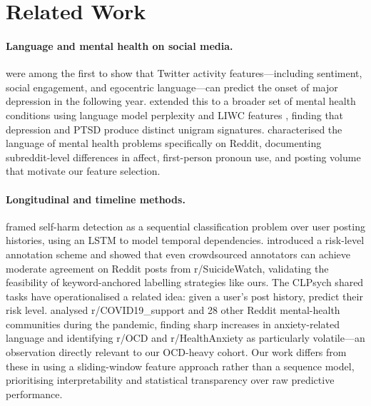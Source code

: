 \documentclass[11pt]{article}
\begin{document}
\section{Related Work}
\label{sec:related}

\paragraph{Language and mental health on social media.}
\citet{dechoudhury2013predicting} were among the first to show that
Twitter activity features---including sentiment, social engagement, and
egocentric language---can predict the onset of major depression in the
following year.
\citet{coppersmith2014quantifying} extended this to a broader set of
mental health conditions using language model perplexity and LIWC features
\citep{pennebaker2015development}, finding that depression and PTSD produce
distinct unigram signatures.
\citet{gkotsis2016language} characterised the language of mental health
problems specifically on Reddit, documenting subreddit-level differences
in affect, first-person pronoun use, and posting volume that motivate our
feature selection.

\paragraph{Longitudinal and timeline methods.}
\citet{yates2017depression} framed self-harm detection as a sequential
classification problem over user posting histories, using an LSTM to
model temporal dependencies.
\citet{shing2018expert} introduced a risk-level annotation scheme and
showed that even crowdsourced annotators can achieve moderate agreement
on Reddit posts from r/SuicideWatch, validating the feasibility of
keyword-anchored labelling strategies like ours.
The CLPsych shared tasks \citep{zirikly2019clpsych} have operationalised
a related idea: given a user's post history, predict their risk level.
\citet{low2020natural} analysed r/COVID19\_support and 28 other
Reddit mental-health communities during the pandemic, finding
sharp increases in anxiety-related language and identifying
r/OCD and r/HealthAnxiety as particularly volatile---an observation
directly relevant to our OCD-heavy cohort.
Our work differs from these in using a sliding-window feature approach
rather than a sequence model, prioritising interpretability and
statistical transparency over raw predictive performance.
\end{document}

